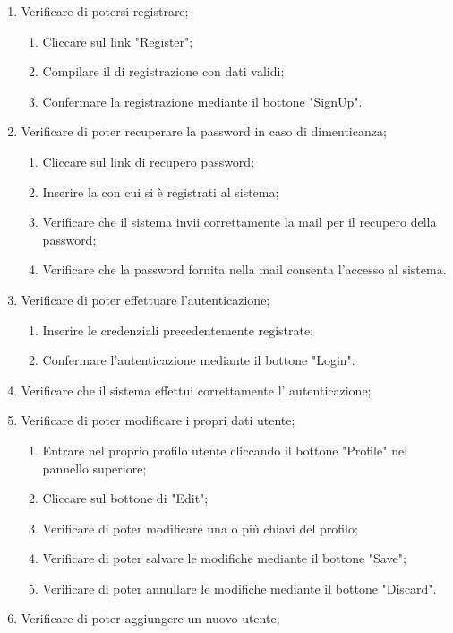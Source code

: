 \begin{enumerate}
\item Verificare di potersi registrare;
\begin{enumerate}
\item Cliccare sul link "Register";
\item Compilare il  di registrazione con dati validi;
\item Confermare la registrazione mediante il bottone "SignUp".
\end{enumerate}
\item Verificare di poter recuperare la password in caso di dimenticanza;
\begin{enumerate}
\item Cliccare sul link di recupero password;
\item Inserire la  con cui si è registrati al sistema;
\item Verificare che il sistema invii correttamente la mail per il recupero della password;
\item Verificare che la password fornita nella mail consenta l'accesso al sistema.
\end{enumerate}
\item Verificare di poter effettuare l'autenticazione;
\begin{enumerate}
\item Inserire le credenziali precedentemente registrate;
\item Confermare l'autenticazione mediante il bottone "Login".
\end{enumerate}
\item Verificare che il sistema effettui correttamente l' autenticazione;
\item Verificare di poter modificare i propri dati utente;
\begin{enumerate}
\item Entrare nel proprio profilo utente cliccando il bottone "Profile" nel pannello superiore;
\item Cliccare sul bottone di "Edit";
\item Verificare di poter modificare una o più chiavi del profilo;
\item Verificare di poter salvare le modifiche mediante il bottone "Save";
\item Verificare di poter annullare le modifiche mediante il bottone "Discard".
\end{enumerate}
\item Verificare di poter aggiungere un nuovo utente;

\end{enumerate}
